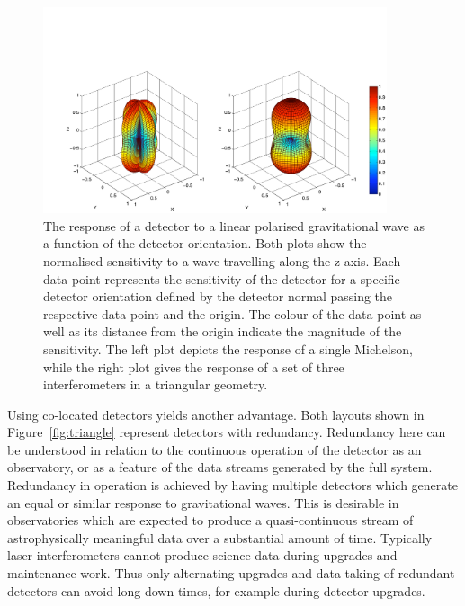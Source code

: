 \begin{figure}[t]
\begin{center}
\includegraphics[width=0.9\textwidth, viewport= 50 0 885 370]{Sec_Optics/ap_mi_trimi.pdf}
\caption{The response of a detector to a linear polarised gravitational wave
as a function of the detector orientation. Both plots show the normalised sensitivity
to a wave travelling along the z-axis. Each data point represents the sensitivity of the
detector for a specific detector orientation defined by the detector normal
passing the respective data point and the origin. The colour
of the data point as well as its distance from the origin indicate the magnitude of the
sensitivity. The left plot depicts the response of a single Michelson, while the right plot
gives the response of a set of three interferometers in a  triangular geometry.
}
\label{fig:triangleAP}
\end{center}
\end{figure}
Using co-located detectors yields another advantage. Both layouts shown in Figure~\ref{fig:triangle} represent
detectors with redundancy. Redundancy here can be understood in relation to the continuous operation of the
detector as an observatory, or as a feature of the data streams generated by the full system. Redundancy in operation
is achieved by having multiple detectors which generate an equal or similar response to gravitational waves.
This is desirable in observatories which are expected to produce a quasi-continuous stream of astrophysically meaningful
data over a substantial amount of time. Typically laser interferometers cannot produce science data during
upgrades and maintenance work. Thus only alternating upgrades and data taking of redundant detectors can
avoid long down-times, for example during detector upgrades.

